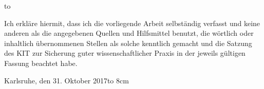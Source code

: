 \thispagestyle{empty}
\vspace*{32\baselineskip}
\hbox to \textwidth{\hrulefill}
\par
Ich erkläre hiermit, dass ich die vorliegende Arbeit selbständig verfasst und
keine anderen als die angegebenen Quellen und Hilfsmittel benutzt, 
die wörtlich oder inhaltlich übernommenen Stellen als solche kenntlich 
gemacht und die Satzung des KIT zur Sicherung guter wissenschaftlicher 
Praxis in der jeweils gültigen Fassung beachtet habe.

\vspace*{2cm}
Karlsruhe, den 31. Oktober 2017\hfill \hbox to 8cm{\hrulefill}

\clearpage






